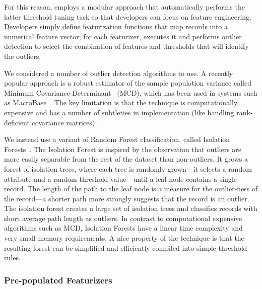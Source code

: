 For this reason, \detectlib employs a modular approach that automatically performs the latter threshold tuning task so that developers can focus on feature engineering.   Developers simply define featurization functions that map records into a numerical feature vector; for each featurizer, \detectlib executes it and performs outlier detection to select the combination of features and thresholds that will identify the outliers.  

We considered a number of outlier detection algorithms to use.  A recently popular approach is a robust estimator of the sample population variance called Minimum Covariance Determinant~\cite{} (MCD), which has been used in systems such as MacroBase~\cite{bailis2016macrobase}.  The key limitation is that the technique is computationally expensive and has a number of subtleties in implementation (like handling rank-deficient covariance matrices) .


We instead use a variant of Random Forest classification, called Isolation Forests~\cite{}.  The Isolation Forest is inspired by the observation that outliers are more easily separable from the rest of the dataset than non-outliers.  It grows a forest of isolation trees, where each tree is randomly grown---it selects a random attribute and a random threshold value---until a leaf node contains a single record.  The length of the path to the leaf node is a measure for the outlier-ness of the record---a shorter path more strongly suggests that the record is an outlier.  The isolation forest creates a large set of isolation trees and classifies records with short average path length as outliers.  In contrast to computational expensive algorithms such as MCD, Isolation Forests have a linear time complexity and very small memory requirements.  A nice property of the technique is that the resulting forest can be simplified and efficiently compiled into simple threshold rules. %


\subsubsection{Pre-populated Featurizers}

